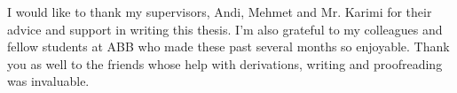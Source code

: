 I would like to thank my supervisors, Andi, Mehmet and Mr. Karimi for their advice and support in writing this thesis.
I'm also grateful to my colleagues and fellow students at ABB who made these past several months so enjoyable.
Thank you as well to the friends whose help with derivations, writing and proofreading was invaluable. 

